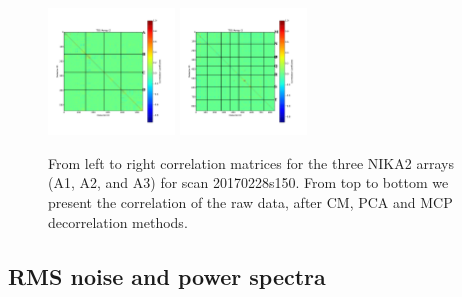 \begin{figure}[ht]
\begin{center}
\includegraphics[width=0.3\textwidth]{Figures/NoiseTests/corrmat_TOI_BCP_array_2_20170228s151.pdf}
\includegraphics[width=0.3\textwidth]{Figures/NoiseTests/corrmat_TOI_BCP_array_3_20170228s151.pdf}
\end{center}
\caption[KID-to-KID correlation matrices]{From left to right correlation matrices for the three NIKA2 arrays (A1, A2, and A3) for scan 20170228s150. From top to bottom we present the correlation of the raw data, after CM, PCA and MCP decorrelation methods. \label{corrmatrix}}
\end{figure}



\subsection{RMS noise and power spectra}

